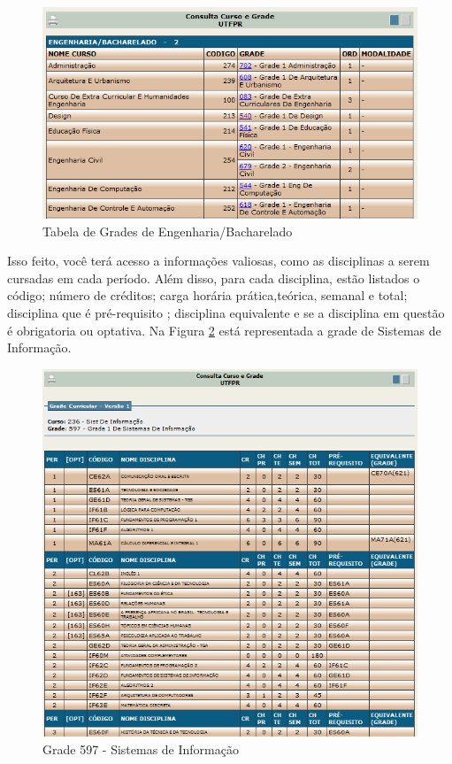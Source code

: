 \documentclass[a4paper,12pt,openany]{article}
\begin{document}
	\begin{figure}[ht!]  \centering
		\includegraphics[scale=0.5]{Grade_Tabela.png}
		\caption{Tabela de Grades de Engenharia/Bacharelado}
		\label{gradeTabela}
	\end{figure}

Isso feito, você terá acesso a informações valiosas, como as disciplinas a serem cursadas em cada período. Além disso, para cada disciplina, estão listados o código; número de créditos; carga horária prática,teórica, semanal e total; disciplina que é pré-requisito ; disciplina equivalente e se a disciplina em questão é obrigatoria ou optativa. Na Figura \ref{gradeCurso} está representada a grade de Sistemas de Informação.

	\begin{figure}[ht!]  \centering
		\includegraphics[scale=0.5]{Grade_Curso.png}
		\caption{Grade 597 - Sistemas de Informação}
		\label{gradeCurso}
	\end{figure}
\end{document}
